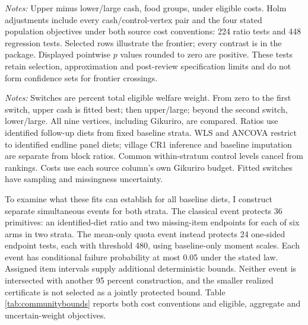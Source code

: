 \documentclass[11pt]{article}
\begin{document}
\begin{table}[t]
\centering\caption{Sampling sensitivity of the cash frontier}\label{tab:cashuncertainty}
\resizebox{\textwidth}{!}{}
\begin{minipage}{\textwidth}\footnotesize\emph{Notes:} Upper minus lower/large cash, food groups, under eligible costs. Holm adjustments include every cash/control-vertex pair and the four stated population objectives under both source cost conventions: 224 ratio tests and 448 regression tests. Selected rows illustrate the frontier; every contrast is in the package. Displayed pointwise $p$ values rounded to zero are positive. These tests retain selection, approximation and post-review specification limits and do not form confidence sets for frontier crossings.\end{minipage}
\end{table}

\begin{table}[t]
\centering\caption{Fitted cash frontier over the eligible welfare share}\label{tab:communityfrontier}

\begin{minipage}{\textwidth}\footnotesize\emph{Notes:} Switches are percent total eligible welfare weight. From zero to the first switch, upper cash is fitted best; then upper/large; beyond the second switch, lower/large. All nine vertices, including Gikuriro, are compared. Ratios use identified follow-up diets from fixed baseline strata. WLS and ANCOVA restrict to identified endline panel diets; village CR1 inference and baseline imputation are separate from block ratios. Common within-stratum control levels cancel from rankings. Costs use each source column's own Gikuriro budget. Fitted switches have sampling and missingness uncertainty.\end{minipage}
\end{table}

To examine what these fits can establish for all baseline diets, I construct separate simultaneous events for both strata. The classical event protects 36 primitives: an identified-diet ratio and two missing-item endpoints for each of six arms in two strata. The mean-only quota event instead protects 24 one-sided endpoint tests, each with threshold 480, using baseline-only moment scales. Each event has conditional failure probability at most 0.05 under the stated law. Assigned item intervals supply additional deterministic bounds. Neither event is intersected with another 95 percent construction, and the smaller realized certificate is not selected as a jointly protected bound. Table \ref{tab:communitybounds} reports both cost conventions and eligible, aggregate and uncertain-weight objectives.
\end{document}
